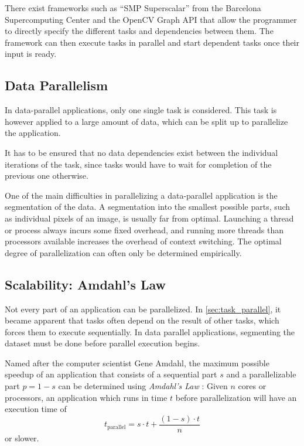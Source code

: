 \documentclass[BCOR20mm,DIV14,10pt,headinclude,footexclude,bibtotoc,liststotoc]{article}
\begin{document}
There exist frameworks such as ``SMP Superscalar'' from the Barcelona
Supercomputing Center and the OpenCV Graph API that allow the programmer to
directly specify the different tasks and dependencies between them. The
framework can then execute tasks in parallel and start dependent tasks once
their input is ready.


\subsection{Data Parallelism}
In data-parallel applications, only one single task is considered. This task is
however applied to a large amount of data, which can be split up to parallelize
the application.

It has to be ensured that no data dependencies exist between the individual
iterations of the task, since tasks would have to wait for completion of the
previous one otherwise.

One of the main difficulties in parallelizing a data-parallel application is the
segmentation of the data. A segmentation into the smallest possible parts, such
as individual pixels of an image, is usually far from optimal. Launching a
thread or process always incurs some fixed overhead, and running more threads
than processors available increases the overhead of context switching. The
optimal degree of parallelization can often only be determined empirically.




\subsection{Scalability: Amdahl's Law}
\label{sec:amdahl}
Not every part of an application can be parallelized. In
\cref{sec:task_parallel}, it became apparent that tasks often depend on the
result of other tasks, which forces them to execute sequentially. In data
parallel applications, segmenting the dataset must be done before parallel
execution begins.

Named after the computer scientist Gene Amdahl, the maximum possible speedup of
an application that consists of a sequential part $s$ and a parallelizable part
$p=1-s$ can be determined using \emph{Amdahl's Law} \cite{amdahl1967}: Given $n$
cores or processors, an application which runs in time $t$ before
parallelization will have an execution time of
\begin{equation}
	t_\text{parallel} = s \cdot t + \frac{(1-s)\cdot t}{n}
\end{equation}
or slower.
\end{document}
